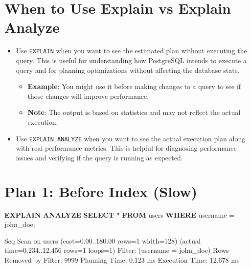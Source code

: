 \documentclass[
]{report}
\newenvironment{Shaded}{\begin{snugshade}}{\end{snugshade}}
\newcommand{\KeywordTok}[1]{\textcolor[rgb]{0.00,0.23,0.31}{\textbf{#1}}}
\newcommand{\NormalTok}[1]{\textcolor[rgb]{0.00,0.23,0.31}{#1}}
\newcommand{\OperatorTok}[1]{\textcolor[rgb]{0.37,0.37,0.37}{#1}}
\newcommand{\StringTok}[1]{\textcolor[rgb]{0.13,0.47,0.30}{#1}}
\providecommand{\tightlist}{%
  \setlength{\itemsep}{0pt}\setlength{\parskip}{0pt}}\usepackage{longtable,booktabs,array}
\begin{document}
\section{When to Use Explain vs Explain
Analyze}\label{when-to-use-explain-vs-explain-analyze}

\begin{itemize}
\tightlist
\item
  Use \texttt{EXPLAIN} when you want to see the estimated plan without
  executing the query. This is useful for understanding how PostgreSQL
  intends to execute a query and for planning optimizations without
  affecting the database state.

  \begin{itemize}
  \tightlist
  \item
    \textbf{Example}: You might use it before making changes to a query
    to see if those changes will improve performance.
  \item
    \textbf{Note}: The output is based on statistics and may not reflect
    the actual execution.
  \end{itemize}
\item
  Use \texttt{EXPLAIN\ ANALYZE} when you want to see the actual
  execution plan along with real performance metrics. This is helpful
  for diagnosing performance issues and verifying if the query is
  running as expected.
\end{itemize}

\section{Plan 1: Before Index (Slow)}\label{plan-1-before-index-slow}

\begin{Shaded}
\begin{Highlighting}[]
\KeywordTok{EXPLAIN} \KeywordTok{ANALYZE}
\KeywordTok{SELECT} \OperatorTok{*} \KeywordTok{FROM}\NormalTok{ users }\KeywordTok{WHERE}\NormalTok{ username }\OperatorTok{=} \StringTok{\textquotesingle{}john\_doe\textquotesingle{}}\NormalTok{;}
\end{Highlighting}
\end{Shaded}

\begin{Shaded}
\begin{Highlighting}[]
\NormalTok{Seq Scan on users  (cost=0.00..180.00 rows=1 width=128) }
\NormalTok{                   (actual time=0.234..12.456 rows=1 loops=1)}
\NormalTok{  Filter: (username = \textquotesingle{}john\_doe\textquotesingle{})}
\NormalTok{  Rows Removed by Filter: 9999}
\NormalTok{Planning Time: 0.123 ms}
\NormalTok{Execution Time: 12.678 ms}
\end{Highlighting}
\end{Shaded}
\end{document}

